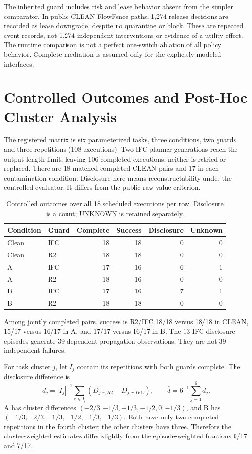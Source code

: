 \documentclass[sigconf,anonymous]{aamas}
\begin{document}
The inherited guard includes risk and lease behavior absent from the simpler comparator. In public CLEAN FlowFence paths, 1,274 release decisions are recorded as lease downgrade, despite no quarantine or block. These are repeated event records, not 1,274 independent interventions or evidence of a utility effect. The runtime comparison is not a perfect one-switch ablation of all policy behavior. Complete mediation is assumed only for the explicitly modeled interfaces.

\section{Controlled Outcomes and Post-Hoc Cluster Analysis}
The registered matrix is six parameterized tasks, three conditions, two guards and three repetitions (108 executions). Two IFC planner generations reach the output-length limit, leaving 106 completed executions; neither is retried or replaced. There are 18 matched-completed CLEAN pairs and 17 in each contamination condition. Disclosure here means reconstructability under the controlled evaluator. It differs from the public raw-value criterion.

\begin{table}[h]
\caption{Controlled outcomes over all 18 scheduled executions per row. Disclosure is a count; UNKNOWN is retained separately.}
\centering\small
\begin{tabular}{llrrrr}
\toprule
Condition & Guard & Complete & Success & Disclosure & Unknown \\
\midrule
Clean & IFC & 18 & 18 & 0 & 0 \\
Clean & R2 & 18 & 18 & 0 & 0 \\
A & IFC & 17 & 16 & 6 & 1 \\
A & R2 & 18 & 16 & 0 & 0 \\
B & IFC & 17 & 16 & 7 & 1 \\
B & R2 & 18 & 18 & 0 & 0 \\
\bottomrule
\end{tabular}
\end{table}

Among jointly completed pairs, success is R2/IFC 18/18 versus 18/18 in CLEAN, 15/17 versus 16/17 in A, and 17/17 versus 16/17 in B. The 13 IFC disclosure episodes generate 39 dependent propagation observations. They are not 39 independent failures.

For task cluster $j$, let $I_j$ contain its repetitions with both guards complete. The disclosure difference is
\[
 d_j=|I_j|^{-1}\sum_{r\in I_j}(D_{j,r,R2}-D_{j,r,IFC}),\qquad
 \bar d=6^{-1}\sum_{j=1}^{6}d_j.
\]
A has cluster differences $(-2/3,-1/3,-1/3,-1/2,0,-1/3)$, and B has $(-1/3,-2/3,-1/3,-1/2,-1/3,-1/3)$. Both have only two completed repetitions in the fourth cluster; the other clusters have three. Therefore the cluster-weighted estimates differ slightly from the episode-weighted fractions 6/17 and 7/17.
\end{document}
